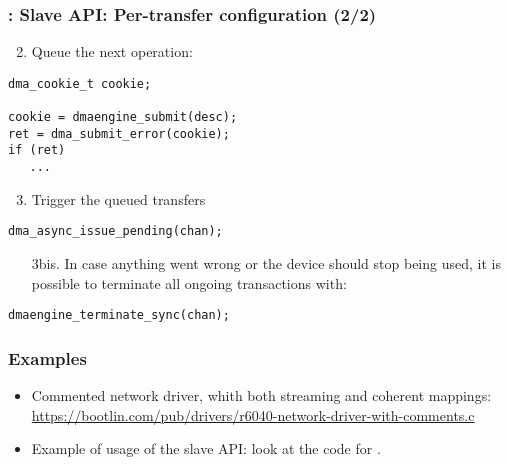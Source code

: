 \begin{frame}[fragile]
  \frametitle{: Slave API: Per-transfer configuration (2/2)}
  \begin{enumerate}
    \setcounter{enumi}{1}
  \item Queue the next operation:
  \end{enumerate}
  \begin{verbatim}
dma_cookie_t cookie;

cookie = dmaengine_submit(desc);
ret = dma_submit_error(cookie);
if (ret)
   ...
\end{verbatim}
  \begin{enumerate}
    \setcounter{enumi}{2}
  \item Trigger the queued transfers
  \end{enumerate}
  \begin{verbatim}
dma_async_issue_pending(chan);
\end{verbatim}
  \begin{enumerate}
  \item[3bis.] In case anything went wrong or the device should stop being
    used, it is possible to terminate all ongoing transactions with:
  \end{enumerate}
  \begin{verbatim}
dmaengine_terminate_sync(chan);
\end{verbatim}
\end{frame}

\begin{frame}
  \frametitle{Examples}
  \begin{itemize}
  \item Commented network driver, whith both streaming and coherent
    mappings:\\
    \small \url{https://bootlin.com/pub/drivers/r6040-network-driver-with-comments.c}
  \item Example of usage of the slave API: look at the code for
    .
  \end{itemize}
\end{frame}

